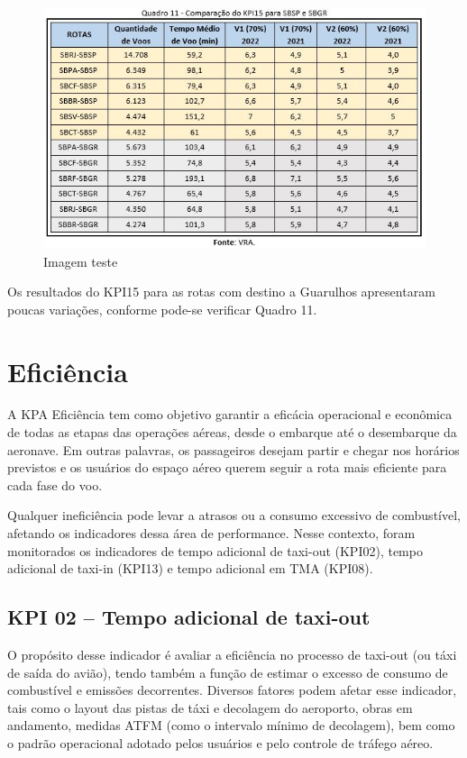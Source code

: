 \documentclass[
]{book}
\begin{document}
\begin{figure}
\centering
\includegraphics{imagens/fig46.jpg}
\caption{Imagem teste}
\end{figure}

Os resultados do KPI15 para as rotas com destino a Guarulhos apresentaram poucas variações, conforme pode-se verificar Quadro 11.

\hypertarget{eficiuxeancia}{%
\section{Eficiência}\label{eficiuxeancia}}

A KPA Eficiência tem como objetivo garantir a eficácia operacional e econômica de todas as etapas das operações aéreas, desde o embarque até o desembarque da aeronave. Em outras palavras, os passageiros desejam partir e chegar nos horários previstos e os usuários do espaço aéreo querem seguir a rota mais eficiente para cada fase do voo.

Qualquer ineficiência pode levar a atrasos ou a consumo excessivo de combustível, afetando os indicadores dessa área de performance. Nesse contexto, foram monitorados os indicadores de tempo adicional de taxi-out (KPI02), tempo adicional de taxi-in (KPI13) e tempo adicional em TMA (KPI08).

\hypertarget{kpi-02-tempo-adicional-de-taxi-out}{%
\subsection{KPI 02 -- Tempo adicional de taxi-out}\label{kpi-02-tempo-adicional-de-taxi-out}}

O propósito desse indicador é avaliar a eficiência no processo de taxi-out (ou táxi de saída do avião), tendo também a função de estimar o excesso de consumo de combustível e emissões decorrentes. Diversos fatores podem afetar esse indicador, tais como o layout das pistas de táxi e decolagem do aeroporto, obras em andamento, medidas ATFM (como o intervalo mínimo de decolagem), bem como o padrão operacional adotado pelos usuários e pelo controle de tráfego aéreo.
\end{document}
